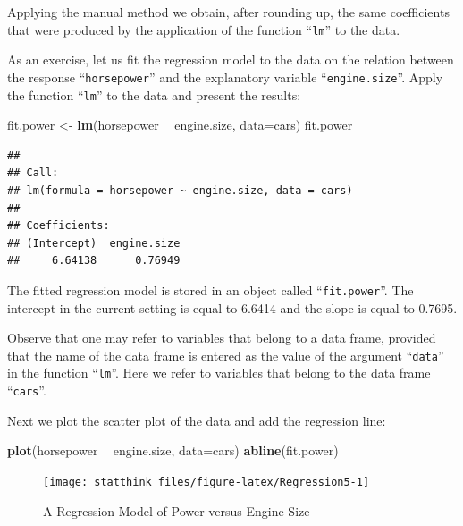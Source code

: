 \documentclass[]{krantz}
\makeatletter
\newenvironment{Shaded}{\begin{snugshade}}{\end{snugshade}}
\newcommand{\KeywordTok}[1]{\textcolor[rgb]{0.13,0.29,0.53}{\textbf{#1}}}
\newcommand{\DataTypeTok}[1]{\textcolor[rgb]{0.13,0.29,0.53}{#1}}
\newcommand{\StringTok}[1]{\textcolor[rgb]{0.31,0.60,0.02}{#1}}
\newcommand{\OperatorTok}[1]{\textcolor[rgb]{0.81,0.36,0.00}{\textbf{#1}}}
\newcommand{\NormalTok}[1]{#1}
\newenvironment{kframe}{%
\medskip{}
\setlength{\fboxsep}{.8em}
 \def\at@end@of@kframe{}%
 \ifinner\ifhmode%
  \def\at@end@of@kframe{\end{minipage}}%
  \begin{minipage}{\columnwidth}%
 \fi\fi%
 \def\FrameCommand##1{\hskip\@totalleftmargin \hskip-\fboxsep
 \colorbox{shadecolor}{##1}\hskip-\fboxsep
     \hskip-\linewidth \hskip-\@totalleftmargin \hskip\columnwidth}%
 \MakeFramed {\advance\hsize-\width
   \@totalleftmargin\z@ \linewidth\hsize
   \@setminipage}}%
 {\par\unskip\endMakeFramed%
 \at@end@of@kframe}
\renewenvironment{Shaded}{\begin{kframe}}{\end{kframe}}
\theoremstyle{definition}
\theoremstyle{definition}
\theoremstyle{definition}
\theoremstyle{remark}
\makeatother
\begin{document}
Applying the manual method we obtain, after rounding up, the same
coefficients that were produced by the application of the function
``\texttt{lm}'' to the data.

As an exercise, let us fit the regression model to the data on the
relation between the response ``\texttt{horsepower}'' and the
explanatory variable ``\texttt{engine.size}''. Apply the function
``\texttt{lm}'' to the data and present the results:

\begin{Shaded}
\begin{Highlighting}[]
\NormalTok{fit.power <-}\StringTok{ }\KeywordTok{lm}\NormalTok{(horsepower }\OperatorTok{~}\StringTok{ }\NormalTok{engine.size, }\DataTypeTok{data=}\NormalTok{cars)}
\NormalTok{fit.power}
\end{Highlighting}
\end{Shaded}

\begin{verbatim}
## 
## Call:
## lm(formula = horsepower ~ engine.size, data = cars)
## 
## Coefficients:
## (Intercept)  engine.size  
##     6.64138      0.76949
\end{verbatim}

The fitted regression model is stored in an object called
``\texttt{fit.power}''. The intercept in the current setting is equal to
6.6414 and the slope is equal to 0.7695.

Observe that one may refer to variables that belong to a data frame,
provided that the name of the data frame is entered as the value of the
argument ``\texttt{data}'' in the function ``\texttt{lm}''. Here we
refer to variables that belong to the data frame ``\texttt{cars}''.

Next we plot the scatter plot of the data and add the regression line:

\begin{Shaded}
\begin{Highlighting}[]
\KeywordTok{plot}\NormalTok{(horsepower }\OperatorTok{~}\StringTok{ }\NormalTok{engine.size, }\DataTypeTok{data=}\NormalTok{cars)}
\KeywordTok{abline}\NormalTok{(fit.power)}
\end{Highlighting}
\end{Shaded}

\begin{figure}

{\centering \texttt{[image: statthink\_files/figure-latex/Regression5-1]} 

}

\caption{A Regression Model of Power versus Engine Size}\label{fig:Regression5}
\end{figure}
\end{document}
